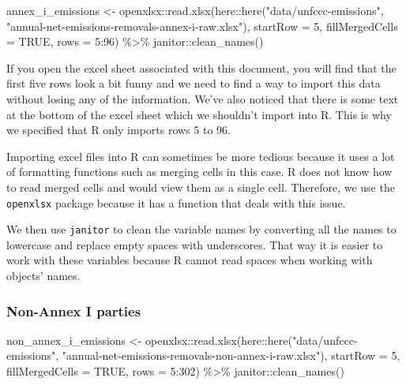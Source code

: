 \documentclass[
  12pt,
]{article}
\newenvironment{Shaded}{}{}
\newcommand{\AttributeTok}[1]{\textcolor[rgb]{0.49,0.56,0.16}{#1}}
\newcommand{\ConstantTok}[1]{\textcolor[rgb]{0.53,0.00,0.00}{#1}}
\newcommand{\DecValTok}[1]{\textcolor[rgb]{0.25,0.63,0.44}{#1}}
\newcommand{\FunctionTok}[1]{\textcolor[rgb]{0.02,0.16,0.49}{#1}}
\newcommand{\NormalTok}[1]{#1}
\newcommand{\OtherTok}[1]{\textcolor[rgb]{0.00,0.44,0.13}{#1}}
\newcommand{\SpecialCharTok}[1]{\textcolor[rgb]{0.25,0.44,0.63}{#1}}
\newcommand{\StringTok}[1]{\textcolor[rgb]{0.25,0.44,0.63}{#1}}
\begin{document}
\begin{Shaded}
\begin{Highlighting}[]
\NormalTok{annex\_i\_emissions }\OtherTok{\textless{}{-}}\NormalTok{ openxlsx}\SpecialCharTok{::}\FunctionTok{read.xlsx}\NormalTok{(here}\SpecialCharTok{::}\FunctionTok{here}\NormalTok{(}\StringTok{"data/unfccc{-}emissions"}\NormalTok{, }
    \StringTok{"annual{-}net{-}emissions{-}removals{-}annex{-}i{-}raw.xlsx"}\NormalTok{), }
    \AttributeTok{startRow =} \DecValTok{5}\NormalTok{, }\AttributeTok{fillMergedCells =} \ConstantTok{TRUE}\NormalTok{, }
    \AttributeTok{rows =} \DecValTok{5}\SpecialCharTok{:}\DecValTok{96}\NormalTok{) }\SpecialCharTok{\%\textgreater{}\%}
\NormalTok{    janitor}\SpecialCharTok{::}\FunctionTok{clean\_names}\NormalTok{()}
\end{Highlighting}
\end{Shaded}

If you open the excel sheet associated with this document, you will find
that the first five rows look a bit funny and we need to find a way to
import this data without losing any of the information. We've also
noticed that there is some text at the bottom of the excel sheet which
we shouldn't import into R. This is why we specified that R only imports
rows 5 to 96.

Importing excel files into R can sometimes be more tedious because it
uses a lot of formatting functions such as merging cells in this case. R
does not know how to read merged cells and would view them as a single
cell. Therefore, we use the \texttt{openxlsx} package because it has a
function that deals with this issue.

We then use \texttt{janitor} to clean the variable names by converting
all the names to lowercase and replace empty spaces with underscores.
That way it is easier to work with these variables because R cannot read
spaces when working with objects' names.

\hypertarget{non-annex-i-parties}{%
\subsubsection{Non-Annex I parties}\label{non-annex-i-parties}}

\begin{Shaded}
\begin{Highlighting}[]
\NormalTok{non\_annex\_i\_emissions }\OtherTok{\textless{}{-}}\NormalTok{ openxlsx}\SpecialCharTok{::}\FunctionTok{read.xlsx}\NormalTok{(here}\SpecialCharTok{::}\FunctionTok{here}\NormalTok{(}\StringTok{"data/unfccc{-}emissions"}\NormalTok{, }
    \StringTok{"annual{-}net{-}emissions{-}removals{-}non{-}annex{-}i{-}raw.xlsx"}\NormalTok{), }
    \AttributeTok{startRow =} \DecValTok{5}\NormalTok{, }\AttributeTok{fillMergedCells =} \ConstantTok{TRUE}\NormalTok{, }
    \AttributeTok{rows =} \DecValTok{5}\SpecialCharTok{:}\DecValTok{302}\NormalTok{) }\SpecialCharTok{\%\textgreater{}\%}
\NormalTok{    janitor}\SpecialCharTok{::}\FunctionTok{clean\_names}\NormalTok{()}
\end{Highlighting}
\end{Shaded}
\end{document}
